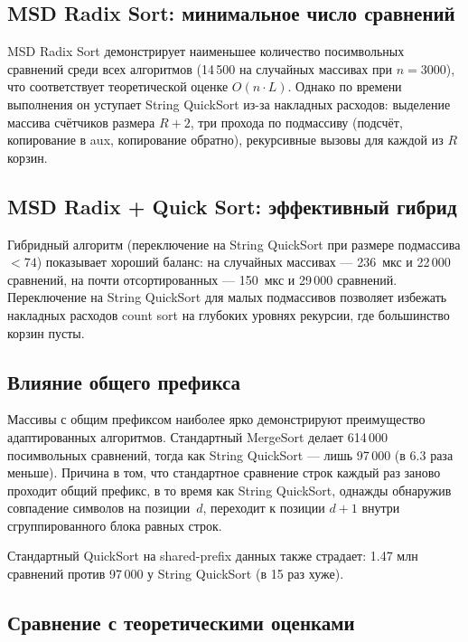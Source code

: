 \documentclass[12pt,a4paper]{article}
\begin{document}
\subsection{MSD Radix Sort: минимальное число сравнений}

MSD Radix Sort демонстрирует наименьшее количество посимвольных сравнений среди всех алгоритмов (14\,500 на случайных массивах при $n=3000$), что соответствует теоретической оценке $O(n \cdot L)$. Однако по времени выполнения он уступает String QuickSort из-за накладных расходов: выделение массива счётчиков размера $R+2$, три прохода по подмассиву (подсчёт, копирование в aux, копирование обратно), рекурсивные вызовы для каждой из $R$ корзин.

\subsection{MSD Radix + Quick Sort: эффективный гибрид}

Гибридный алгоритм (переключение на String QuickSort при размере подмассива $< 74$) показывает хороший баланс: на случайных массивах — 236~мкс и 22\,000 сравнений, на почти отсортированных — 150~мкс и 29\,000 сравнений. Переключение на String QuickSort для малых подмассивов позволяет избежать накладных расходов count sort на глубоких уровнях рекурсии, где большинство корзин пусты.

\subsection{Влияние общего префикса}

Массивы с общим префиксом наиболее ярко демонстрируют преимущество адаптированных алгоритмов. Стандартный MergeSort делает 614\,000 посимвольных сравнений, тогда как String QuickSort — лишь 97\,000 (в 6.3 раза меньше). Причина в том, что стандартное сравнение строк каждый раз заново проходит общий префикс, в то время как String QuickSort, однажды обнаружив совпадение символов на позиции~$d$, переходит к позиции $d+1$ внутри сгруппированного блока равных строк.

Стандартный QuickSort на shared-prefix данных также страдает: 1.47 млн сравнений против 97\,000 у String QuickSort (в 15 раз хуже).

\subsection{Сравнение с теоретическими оценками}
\end{document}
